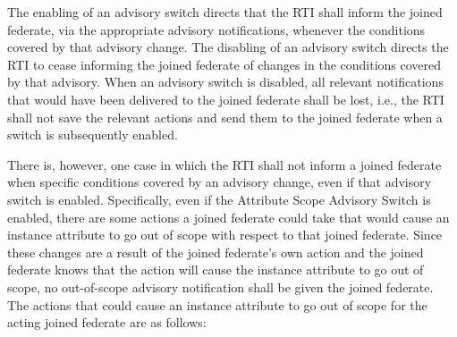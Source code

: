\begin{compactstdpage}
    The enabling of an advisory switch directs that the RTI shall inform the joined federate, via the appropriate advisory notifications, whenever the conditions covered by that advisory change. The disabling of an advisory switch directs the RTI to cease informing the joined federate of changes in the conditions covered by that advisory. When an advisory switch is disabled, all relevant notifications that would have been delivered to the joined federate shall be lost, i.e., the RTI shall not save the relevant actions and send them to the joined federate when a switch is subsequently enabled.

    There is, however, one case in which the RTI shall not inform a joined federate when specific conditions covered by an advisory change, even if that advisory switch is enabled. Specifically, even if the Attribute Scope Advisory Switch is enabled, there are some actions a joined federate could take that would cause an instance attribute to go out of scope with respect to that joined federate. Since these changes are a result of the joined federate's own action and the joined federate knows that the action will cause the instance attribute to go out of scope, no out-of-scope advisory notification shall be given the joined federate. The actions that could cause an instance attribute to go out of scope for the acting joined federate are as follows:

\end{compactstdpage}

\clearpage

